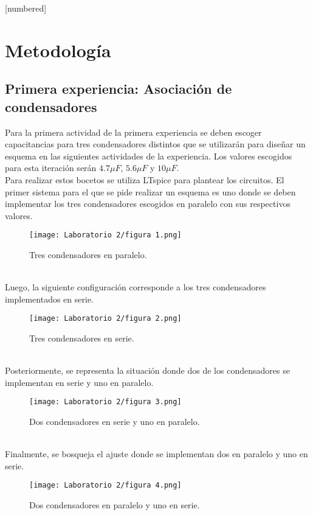 \documentclass[letterpaper,11pt]{article} %
\begin{document}
[numbered]

\newcommand{\avg}[1]{\langle #1 \rangle}




\section{Metodología}
\subsection{Primera experiencia: Asociación de condensadores}
Para la primera actividad de la primera experiencia se deben escoger capacitancias para tres condensadores distintos que se utilizarán para diseñar un esquema en las siguientes actividades de la experiencia. Los valores escogidos para esta iteración serán $4.7\mu F$, $5.6\mu F$ y $10\mu F$. \\
Para realizar estos bocetos se utiliza LTspice para plantear los circuitos. El primer sistema para el que se pide realizar un esquema es uno donde se deben implementar los tres condensadores escogidos en paralelo con sus respectivos valores.\\
\begin{figure}
    \centering
    \texttt{[image: Laboratorio 2/figura 1.png]}
    \caption{Tres condensadores en paralelo.}
    \label{fig:condensadores_enparalelo}
\end{figure}
\\
Luego, la siguiente configuración corresponde a los tres condensadores implementados en serie.
\begin{figure}
    \centering
    \texttt{[image: Laboratorio 2/figura 2.png]}
    \caption{Tres condensadores en serie.}
    \label{fig:condensadores_enserie}
\end{figure}
\\
Posteriormente, se representa la situación donde dos de los condensadores se implementan en serie y uno en paralelo.
\begin{figure}
    \centering
    \texttt{[image: Laboratorio 2/figura 3.png]}
    \caption{Dos condensadores en serie y uno en paralelo.}
    \label{fig:condensadores_2enserie_1enparalelo}
\end{figure}
\\
Finalmente, se bosqueja el ajuste donde se implementan dos en paralelo y uno en serie.
\begin{figure}
    \centering
    \texttt{[image: Laboratorio 2/figura 4.png]}
    \caption{Dos condensadores en paralelo y uno en serie.}
    \label{fig:condensadores_2enparalelo_1enserie}
\end{figure}
\end{document}
